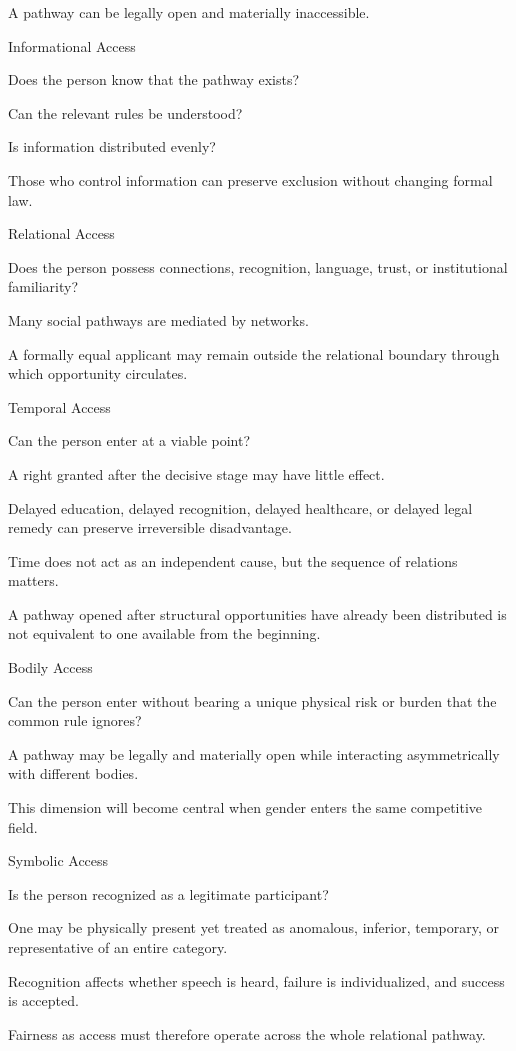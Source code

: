 A pathway can be legally open and materially inaccessible.

Informational Access

Does the person know that the pathway exists?

Can the relevant rules be understood?

Is information distributed evenly?

Those who control information can preserve exclusion without changing formal law.

Relational Access

Does the person possess connections, recognition, language, trust, or institutional familiarity?

Many social pathways are mediated by networks.

A formally equal applicant may remain outside the relational boundary through which opportunity circulates.

Temporal Access

Can the person enter at a viable point?

A right granted after the decisive stage may have little effect.

Delayed education, delayed recognition, delayed healthcare, or delayed legal remedy can preserve irreversible disadvantage.

Time does not act as an independent cause, but the sequence of relations matters.

A pathway opened after structural opportunities have already been distributed is not equivalent to one available from the beginning.

Bodily Access

Can the person enter without bearing a unique physical risk or burden that the common rule ignores?

A pathway may be legally and materially open while interacting asymmetrically with different bodies.

This dimension will become central when gender enters the same competitive field.

Symbolic Access

Is the person recognized as a legitimate participant?

One may be physically present yet treated as anomalous, inferior, temporary, or representative of an entire category.

Recognition affects whether speech is heard, failure is individualized, and success is accepted.

Fairness as access must therefore operate across the whole relational pathway.

